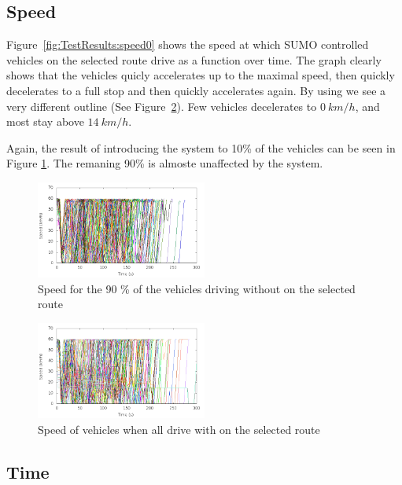 \subsection{Speed}
Figure~\ref{fig:TestResults:speed0} shows the speed at which SUMO controlled vehicles on the selected route drive as a function over time.
The graph clearly shows that the vehicles quicly accelerates up to the maximal speed, then quickly decelerates to a full stop and then quickly accelerates again.
By using \tech we see a very different outline (See Figure~\ref{fig:TestResults:speed100}).
Few vehicles decelerates to $0\ km/h$, and most stay above $14\ km/h$.

Again, the result of introducing the system to 10\% of the vehicles can be seen in Figure \ref{fig:TestResults:speedUnC10}. 
The remaning 90\% is almoste unaffected by the system.

\begin{figure}[H]
\includegraphics[width=0.5\textwidth]{../images/tp0/speedUncontrolled10.png}
\caption{Speed for the 90 \% of the vehicles driving without \tech on the selected route}
\label{fig:TestResults:speedUnC10}
\end{figure}

\begin{figure}[H]
\includegraphics[width=0.5\textwidth]{../images/tp0/speedControlled100.png}
\caption{Speed of vehicles when all drive with \tech on the selected route}
\label{fig:TestResults:speed100}
\end{figure}


\subsection{Time}

